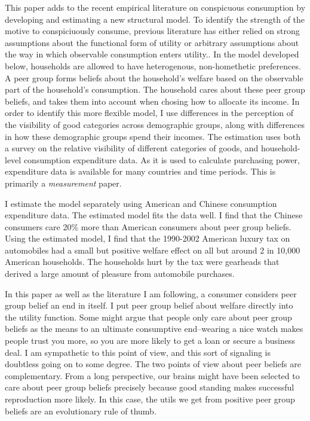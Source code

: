 \documentclass[12pt]{article}
\begin{document}
This paper adds to the recent empirical literature on conspicuous consumption by developing and estimating a new structural model.  To identify the strength of the motive to conspiciuously consume, previous literature has either relied on strong assumptions about the functional form of utility or arbitrary assumptions about the way in which observable consumption enters utility.\citep{Heffetz2011, perez2013measuring}.  In the model developed below, households are allowed to have heterogenous, non-homethetic preferences.  A peer group forms beliefs about the household's welfare based on the observable part of the household's consumption.  The household cares about these peer group beliefs, and takes them into account when chosing how to allocate its income.  In order to identify this more flexible model, I use differences in the perception of the visibility of good categories across demographic groups, along with differences in how these demographic groups spend their incomes. The estimation uses both a survey on the relative visibility of different categories of goods, and household-level consumption expenditure data.  As it is used to calculate purchasing power, expenditure data is available for many countries and time periods.  This is primarily a \emph{measurement} paper.

I estimate the model separately using American and Chinese consumption expenditure data.  The estimated model fits the data well.  I find that the Chinese consumers care 20\% more than American consumers about peer group beliefs.  Using the estimated model, I find that the 1990-2002 American luxury tax on automobiles had a small but positive welfare effect on all but around 2 in 10,000 American households.  The households hurt by the tax were gearheads that derived a large amount of pleasure from automobile purchases.

In this paper as well as the literature I am following, a consumer considers peer group belief an end in itself.  I put peer group belief about welfare directly into the utility function.  Some might argue that people only care about peer group beliefs as the means to an ultimate consumptive end--wearing a nice watch makes people trust you more, so you are more likely to get a loan or secure a business deal.  I am sympathetic to this point of view, and this sort of signaling is doubtless going on to some degree.  The two points of view about peer beliefs are complementary.  From a long perspective, our brains might have been selected to care about peer group beliefs precisely because good standing makes successful reproduction more likely. In this case, the utils we get from positive peer group beliefs are an evolutionary rule of thumb.\citep{RobsonSamuelson2010}
\end{document}
